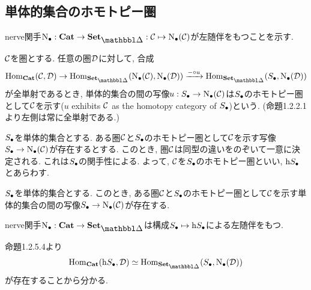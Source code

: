 \documentclass[uplatex, a4paper, 14Q, dvipdfmx]{jsreport}
\begin{document}
\subsection{単体的集合のホモトピー圏}

nerve関手$\N: \cat \to \sset: \calC \mt \N(\calC)$が左随伴をもつことを示す. 

\begin{definition}
  $\calC$を圏とする. 
  任意の圏$\calD$に対して, 合成
  \begin{align*}
    \Hom_{\cat}(\calC,\calD) \to \Hom_{\sset}(\N(\calC),\N(\calD)) 
    \xr{- \ci u} \Hom_{\sset}(\S,\N(\calD)) 
  \end{align*}
  が全単射であるとき, 単体的集合の間の写像$u: \S \to \N(\calC)$は$\S$のホモトピー圏として$\calC$を示す($u$ exhibits $\calC$ as the homotopy category of $\S$)という. 
  (命題1.2.2.1より左側は常に全単射である.) 
\end{definition}

\begin{exe}
  
\end{exe}

\begin{remark}
  $\S$を単体的集合とする. 
  ある圏$\calC$と$\S$のホモトピー圏として$\calC$を示す写像$\S \to \N(\calC)$が存在するとする. 
  このとき, 圏$\calC$は同型の違いをのぞいて一意に決定される. 
  これは$\S$の関手性による. 
  よって, $\calC$を$\S$のホモトピー圏といい, $\h \S$とあらわす. 
\end{remark}

\begin{prop}
  $\S$を単体的集合とする. 
  このとき, ある圏$\calC$と$\S$のホモトピー圏として$\calC$を示す単体的集合の間の写像$\S \to \N(\calC)$が存在する.
\end{prop}

\begin{Proof}
  
\end{Proof}

\begin{cor}
  nerve関手$\N: \cat \to \sset$は構成$\S \mt \h \S$による左随伴をもつ. 
\end{cor}

\begin{Proof}
  命題1.2.5.4より
  \begin{align*}
    \Hom_{\cat}(\h \S,\calD) \simeq \Hom_{\sset}(\S,\N(\calD)) 
  \end{align*}
  が存在することから分かる. 
\end{Proof}
\end{document}
